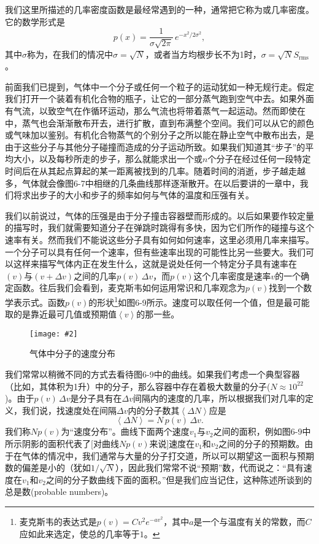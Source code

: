 \documentclass[12pt,oneside]{book}
\newenvironment{fig}[2][1]
{\begin{figure}[H]
\centering
\texttt{[image: \#2]}}
{\end{figure}}
\begin{document}
我们这里所描述的几率密度函数是最经常遇到的一种，通常把它称为或几率密度。它的数学形式是
\begin{equation}
\label{Eq:I:6:20}
p(x)=\frac{1}{\sigma\sqrt{2\pi}}\,e^{-x^2/2\sigma^2},
\end{equation}
其中$\sigma$称为，在我们的情况中$\sigma=\sqrt{N}$，或者当方均根步长不为1时，$\sigma=\sqrt{N}S_{\text{rms}}$。

前面我们已提到，气体中一个分子或任何一个粒子的运动犹如一种无规行走。假定我们打开一个装着有机化合物的瓶子，让它的一部分蒸气跑到空气中去。如果外面有气流，以致空气在作循环运动，那么气流也将带着蒸气一起运动。然而即使在中，蒸气也会渐渐散布开去，进行扩散，直到布满整个空间。我们可以从它的颜色或气味加以鉴别。有机化合物蒸气的个别分子之所以能在静止空气中散布出去，是由于这些分子与其他分子碰撞而造成的分子运动所致。如果我们知道其“步子”的平均大小，以及每秒所走的步子，那么就能求出一个或$n$个分子在经过任何一段特定时间后在从其起点算起的某一距离被找到的几率。随着时间的消逝，步子越走越多，气体就会像图6-7中相继的几条曲线那样逐渐散开。在以后要讲的一章中，我们将求出步子的大小和步子的频率如何与气体的温度和压强有关。

我们以前说过，气体的压强是由于分子撞击容器壁而形成的。以后如果要作较定量的描写时，我们就需要知道分子在弹跳时跳得有多快，因为它们所作的碰撞与这个速率有关。然而我们不能说这些分子具有如何如何速率，这里必须用几率来描写。一个分子可以具有任何一个速率，但有些速率出现的可能性比另一些要大。我们可以这样来描写气体内正在发生什么，这就是说处任何一个特定分子具有速率在$(v)$与$(v+\Delta v)$之间的几率$p(v)\,\Delta v$，而$p(v)$这个几率密度是速率$v$的一个确定函数。往后我们会看到，麦克斯韦如何运用常识和几率观念为$p(v)$找到一个数学表示式。函数$p(v)$的形状\footnote{麦克斯韦的表达式是$p(v)=Cv^2e^{-av^2}$，其中$a$是一个与温度有关的常数，而$C$应如此来选定，使总的几率等于$1$。}如图6-9所示。速度可以取任何一个值，但是最可能取的是靠近最可几值或预期值$\left < v \right >$的那一些。
\begin{fig}{气体中分子的速度分布}
\caption{气体中分子的速度分布}
\label{fig:气体中分子的速度分布}
\end{fig}

我们常常以稍微不同的方式去看待图6-9中的曲线。如果我们考虑一个典型容器（比如，其体积为1升）中的分子，那么容器中存在着极大数量的分子($N\approx10^{22}$)。由于$p(v)\,\Delta v$是分子具有在$\Delta v$间隔内的速度的几率，所以根据我们对几率的定义，我们说，找速度处在间隔$\Delta v$内的分子数其$\left <\Delta N \right >$应是
\begin{equation}
\label{Eq:I:6:21}
\left <\Delta N\right >=N\,p(v)\,\Delta v.
\end{equation}
我们称$Np(v)$为“速度分布”。曲线下面两个速度$v_1$与$v_2$之间的面积，例如图6-9中所示阴影的面积代表了[对曲线$Np(v)$来说]速度在$v_1$和$v_2$之间的分子的预期数。由于在气体的情况中，我们通常与大量的分子打交道，所以可以期望这一面积与预期数的偏差是小的（犹如$1/\sqrt{N}$），因此我们常常不说“预期”数，代而说之：“具有速度在$v_1$和$v_2$之间的分子数曲线下面的面积。”但是我们应当记住，这种陈述所谈到的总是数(probable numbers)。
\end{document}
